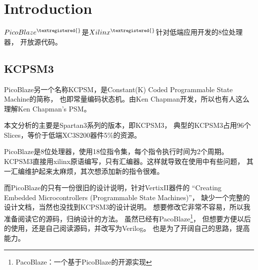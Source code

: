\chapter{Introduction}
$PicoBlaze^{\textregistered{}}$是$Xilinx^{\textregistered{}}$针对低端应用开发的8位处理器，
开放源代码。

\section{KCPSM3}
PicoBlaze另一个名称KCPSM，是Constant(K) Coded Programmable State Machine的简称，
也即常量编码状态机。由Ken Chapman开发，所以也有人这么理解Ken Chapman's PSM。

本文分析的主要是Spartan3系列的版本，即KCPSM3，
典型的KCPSM3占用96个Slices，等价于低端XC3S200器件5\%的资源。

PicoBlaze是8位处理器，使用18位指令集，每个指令执行时间为2个周期。 
KCPSM3直接用xilinx原语编写，只有汇编器。这样就导致在使用中有些问题，
其一汇编维护起来太麻烦，其次想添加新的指令很难。

而PicoBlaze的只有一份很旧的设计说明，针对VertixII器件的
“Creating Embedded Microcontrollers (Programmable State Machines)”，
缺少一个完整的设计文档，当然也没找到KCPSM3的设计说明。
想要修改它非常不容易，所以我准备阅读它的源码，归纳设计的方法。
虽然已经有PacoBlaze\footnote{PacoBlaze：一个基于PicoBlaze的开源实现}，
但想要方便以后的使用，还是自己阅读源码，并改写为Verilog。
也是为了开阔自己的思路，提高能力。

\clearpage

